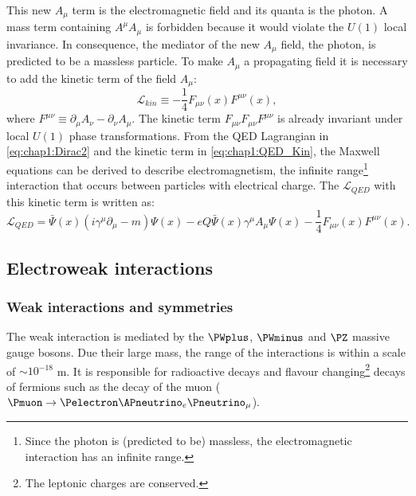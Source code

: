 This new $A_{\mu}$ term is the electromagnetic field and its quanta is the photon.
A mass term containing $A^{\mu}A_{\mu}$ is forbidden because it would violate the $U(1)$ local invariance. 
In consequence, the mediator of the new $A_{\mu}$ field, the photon, is predicted to be a massless particle. 
To make $A_{\mu}$ a propagating field it is necessary to add the kinetic term of the field $A_{\mu}$:
\begin{equation}\label{eq:chap1:QED_Kin}
	\mathcal{L}_{kin} \equiv - \frac{1}{4}F_{\mu \nu}(x) F^{\mu \nu}(x),
\end{equation}
where $F^{\mu \nu} \equiv \partial_{\mu} A_{\nu} -\partial_{\nu} A_{\mu}$. 
The kinetic term $F_{\mu \nu} F_{\mu \nu} F^{\mu \nu}$ is already invariant under local $U(1)$ phase transformations.
From the QED Lagrangian in \ref{eq:chap1:Dirac2} and the kinetic term in \ref{eq:chap1:QED_Kin},
the Maxwell equations can be derived to describe electromagnetism, the infinite range\footnote{Since the photon is (predicted to be) massless, the electromagnetic interaction has an infinite range.} 
interaction that occurs between particles with electrical charge.
The $\mathcal{L}_{QED}$  with this kinetic term is written as:
\begin{equation}\label{eq:chap1:QED_Complete}
	\mathcal{L}_{QED} =  \bar{\Psi}(x) (i  \gamma^{\mu} \partial_{\mu} - m ) \Psi(x) - eQ \bar{\Psi}(x) \gamma^{\mu}A_{\mu} \Psi(x) - \frac{1}{4}F_{\mu \nu}(x) F^{\mu \nu}(x).
\end{equation}


\subsection{Electroweak interactions}
\label{sec:chap1:EW}

\subsubsection{Weak interactions and symmetries}
The weak interaction is mediated by the $\PWplus$, $\PWminus$ and $\PZ$ massive gauge bosons.
Due their large mass, the range of the interactions is within a scale of $\sim 10^{-18}$ m. %
It is responsible for radioactive decays and flavour changing\footnote{The leptonic charges are conserved.} decays of fermions such as the decay of 
the muon ($\Pmuon \rightarrow \Pelectron \APneutrino_{e} \Pneutrino_{\mu}$).


